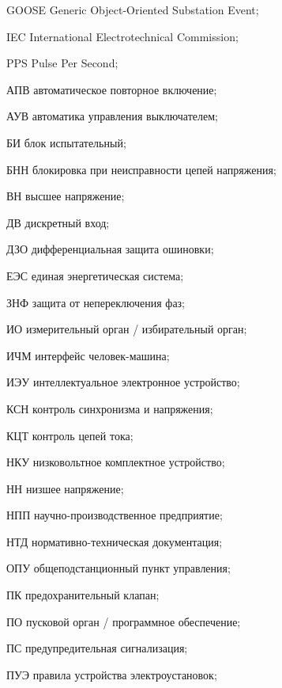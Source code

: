 \begin{list}{}%
{%
  \setlength{\labelwidth}{\abbrwidth}%
  \setlength{\labelsep}{0pt}%
  \setlength{\leftmargin}{\dimexpr\labelwidth+\labelsep\relax}%
  \setlength{\itemindent}{0pt}%
  \setlength{\parsep}{0pt}%
  \setlength{\itemsep}{0pt}
  \renewcommand{\makelabel}[1]{#1 --\hspace{\abbrgap}}%
}
\item[GOOSE] Generic Object-Oriented Substation Event;
\item[IEC]  International Electrotechnical Commission;
\item[PPS] Pulse Per Second;
\item[АПВ] автоматическое повторное включение;
\item[АУВ] автоматика управления выключателем;
\item[БИ] блок испытательный;
\item[БНН] блокировка при неисправности цепей напряжения;
\item[ВН] высшее напряжение;
\item[ДВ] дискретный вход;
\item[ДЗО] дифференциальная защита ошиновки;
\item[ЕЭС] единая энергетическая система;
\item[ЗНФ] защита от непереключения фаз;
\item[ИО] измерительный орган / избирательный орган;
\item[ИЧМ] интерфейс человек-машина;
\item[ИЭУ] интеллектуальное электронное устройство;
\item[КСН] контроль синхронизма и напряжения;
\item[КЦТ] контроль цепей тока;
\item[НКУ] низковольтное комплектное устройство;
\item[НН] низшее напряжение;
\item[НПП] научно-производственное предприятие;
\item[НТД] нормативно-техническая документация;
\item[ОПУ] общеподстанционный пункт управления;
\item[ПК] предохранительный клапан;
\item[ПО] пусковой орган / программное обеспечение;
\item[ПС] предупредительная сигнализация;
\item[ПУЭ] правила устройства электроустановок;

\end{list}
